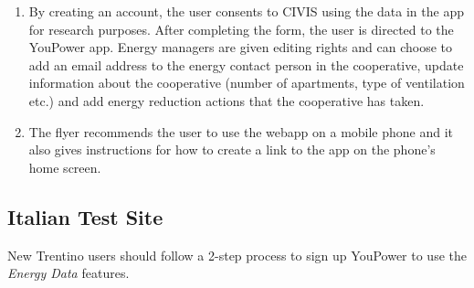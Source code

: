 \begin{enumerate}
\item By creating an account, the user consents to CIVIS using the data in the app for research purposes. After completing the form, the user is directed to the YouPower app. Energy managers are given editing rights and can choose to add an email address to the energy contact person in the cooperative, update information about the cooperative (number of apartments, type of ventilation etc.) and add energy reduction actions that the cooperative has taken.

\item The flyer recommends the user to use the webapp on a mobile phone and it also gives instructions for how to create a link to the app on the phone's home screen.

\end{enumerate}

\subsection{Italian Test Site}

New Trentino users should follow a 2-step process to sign up YouPower to use the \textit{Energy Data} features.


